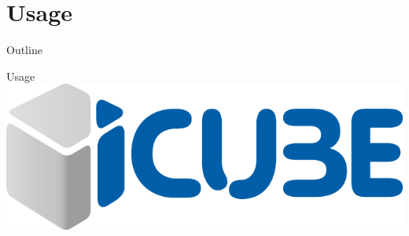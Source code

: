 \section {Usage}
\begin {frame} {Outline}
    \tableofcontents [current]
\end {frame}

\begin {frame} {Usage}
	\includegraphics [width=.7\textwidth,keepaspectratio] {img/icube}
\end {frame}
